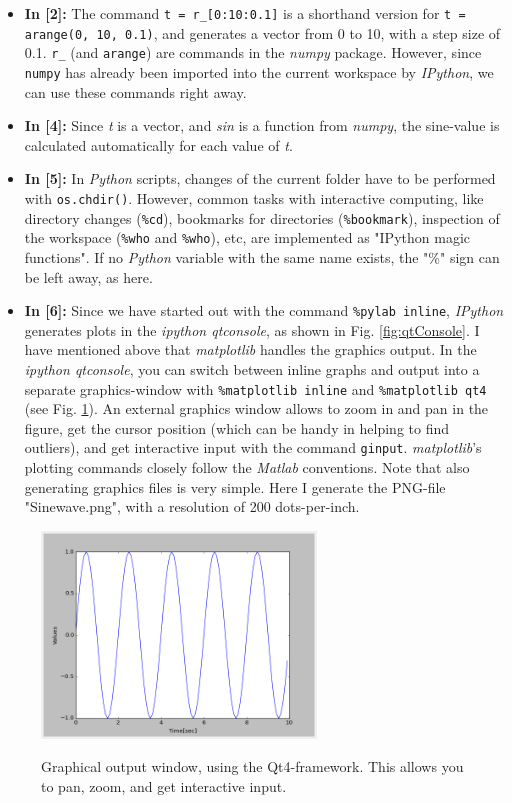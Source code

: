 \begin{itemize}
  \item \textbf{In [2]:} The command \lstinline{t = r_[0:10:0.1]} is a shorthand version for \lstinline{t = arange(0, 10, 0.1)}, and generates a vector from 0 to 10, with a step size of 0.1.  \lstinline{r_} (and \lstinline{arange}) are commands in the \emph{numpy}  package. However, since \lstinline{numpy} has already been imported into the current workspace by \emph{IPython}, we can use these commands right away.
  \item \textbf{In [4]:} Since \emph{t} is a vector, and \emph{sin} is a function from \emph{numpy}, the sine-value is calculated automatically for each value of \emph{t}.
  \item \textbf{In [5]:} In \emph{Python} scripts, changes of the current folder have to be performed with \lstinline{os.chdir()}. However, common tasks with interactive computing, like directory changes (\lstinline{%cd}), bookmarks for directories (\lstinline{%bookmark}), inspection of the workspace (\lstinline{%who} and \lstinline{%who}), etc, are implemented as "IPython magic functions". If no \emph{Python} variable with the same name exists, the "\%" sign can be left away, as here.
  \item \textbf{In [6]:} Since we have started out with the command \lstinline{%pylab inline}, \emph{IPython} generates plots in the \emph{ipython qtconsole}, as shown in Fig. \ref{fig:qtConsole}. I have mentioned above that \emph{matplotlib} handles the graphics output. In the \emph{ipython qtconsole}, you can switch between inline graphs and output into a separate graphics-window with \lstinline{%matplotlib inline} and \lstinline{%matplotlib qt4} (see Fig. \ref{fig:qt4}). An external graphics window allows to zoom in and pan in the figure, get the cursor position (which can be handy in helping to find outliers), and get interactive input with the command \lstinline{ginput}. \emph{matplotlib}'s plotting commands closely follow the \emph{Matlab} conventions. Note that also generating graphics files is very simple. Here I generate the PNG-file "Sinewave.png", with a resolution of 200 dots-per-inch.
\end{itemize}

\begin{figure}
  \centering
  \includegraphics[width=0.65\textwidth]{../Images/qt4.png}\\
  \caption{Graphical output window, using the Qt4-framework. This allows you to pan, zoom, and get interactive input.}
  \label{fig:qt4}
\end{figure}


